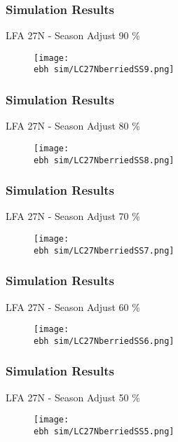 \documentclass{beamer}
\newcommand{\ebh}{\string~/bio.data/bio.lobster/figures/LFA2733Framework2018/} %
\begin{document}
\begin{frame}
\frametitle{Simulation Results}
LFA 27N - Season Adjust 90 \%
\begin{figure}
        \begin{center}
            \texttt{[image: \\ebh sim/LC27NberriedSS9.png]}
        \end{center}
    \end{figure}
\end{frame}


\begin{frame}
\frametitle{Simulation Results}
LFA 27N - Season Adjust 80 \%
\begin{figure}
        \begin{center}
            \texttt{[image: \\ebh sim/LC27NberriedSS8.png]}
        \end{center}
    \end{figure}
\end{frame}


\begin{frame}
\frametitle{Simulation Results}
LFA 27N - Season Adjust 70 \%
\begin{figure}
        \begin{center}
            \texttt{[image: \\ebh sim/LC27NberriedSS7.png]}
        \end{center}
    \end{figure}
\end{frame}


\begin{frame}
\frametitle{Simulation Results}
LFA 27N - Season Adjust 60 \%
\begin{figure}
        \begin{center}
            \texttt{[image: \\ebh sim/LC27NberriedSS6.png]}
        \end{center}
    \end{figure}
\end{frame}


\begin{frame}
\frametitle{Simulation Results}
LFA 27N - Season Adjust 50 \%
\begin{figure}
        \begin{center}
            \texttt{[image: \\ebh sim/LC27NberriedSS5.png]}
        \end{center}
    \end{figure}
\end{frame}
\end{document}
